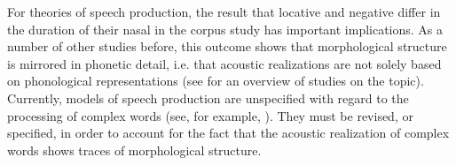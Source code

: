 For theories of speech production, the result that locative  and negative  differ in the duration of their nasal in the corpus study has important implications. 
As a number of other studies before, this outcome shows that morphological structure is mirrored in phonetic detail, i.e. that  acoustic realizations are not solely based on phonological representations (see  for an overview of studies on the topic). Currently, models of speech production are unspecified with regard to the processing of complex words (see, for example, \citealt{Dell.1986,Johnson.1997b,Levelt.1999b,Bybee.2002,Pierrehumbert.2001,Pierrehumbert.2002}). They must be revised, or specified, in order to account for the fact that the acoustic realization of complex words shows traces of morphological structure.


